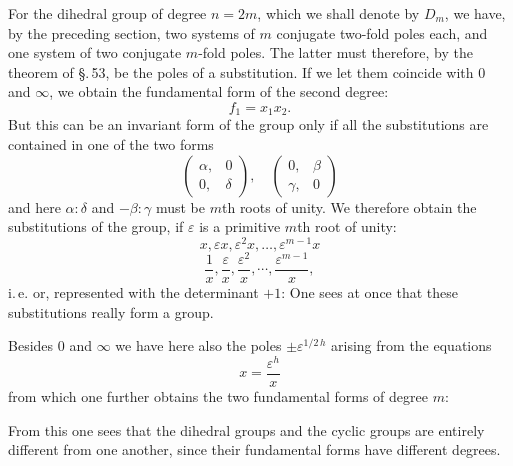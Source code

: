 For the dihedral group of degree $n = 2m$, which we shall denote by $D_m$, we have, by the preceding section, two systems of $m$ conjugate two-fold poles each, and one system of two conjugate $m$-fold poles. The latter must therefore, by the theorem of \S.\,53, be the poles of a substitution. If we let them coincide with $0$ and $\infty$, we obtain the fundamental form of the second degree:
\[
f_1 = x_1 x_2.
\]
But this can be an invariant form of the group only if all the substitutions are contained in one of the two forms
\[
\begin{pmatrix} \alpha, & 0 \\ 0, & \delta \end{pmatrix}, \quad \begin{pmatrix} 0, & \beta \\ \gamma, & 0 \end{pmatrix}
\]
and here $\alpha:\delta$ and $-\beta:\gamma$ must be $m$th roots of unity. We therefore obtain the substitutions of the group, if $\varepsilon$ is a primitive $m$th root of unity:
\[
x, \varepsilon x, \varepsilon^2 x, \ldots, \varepsilon^{m-1} x
\]
\[
\frac{1}{x}, \frac{\varepsilon}{x}, \frac{\varepsilon^2}{x}, \cdots, \frac{\varepsilon^{m-1}}{x},
\]
i.\,e.
or, represented with the determinant $+1$:
One sees at once that these substitutions really form a group.

Besides $0$ and $\infty$ we have here also the poles $\pm \varepsilon^{1/2\,h}$ arising from the equations
\[
x = \frac{\varepsilon^h}{x}
\]
from which one further obtains the two fundamental forms of degree $m$:

From this one sees that the dihedral groups and the cyclic groups are entirely different from one another, since their fundamental forms have different degrees.
